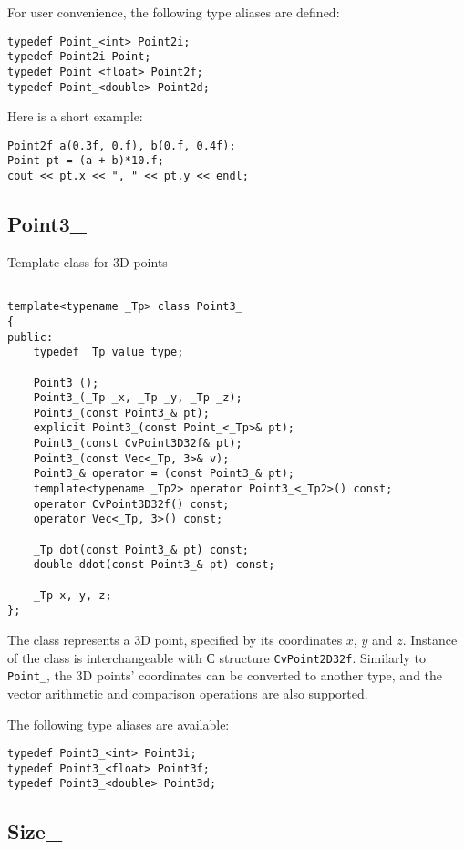 For user convenience, the following type aliases are defined:
\begin{lstlisting}
typedef Point_<int> Point2i;
typedef Point2i Point;
typedef Point_<float> Point2f;
typedef Point_<double> Point2d;
\end{lstlisting}

Here is a short example:
\begin{lstlisting}
Point2f a(0.3f, 0.f), b(0.f, 0.4f);
Point pt = (a + b)*10.f;
cout << pt.x << ", " << pt.y << endl; 
\end{lstlisting}

\subsection{Point3\_}

Template class for 3D points

\begin{lstlisting}

template<typename _Tp> class Point3_
{
public:
    typedef _Tp value_type;
    
    Point3_();
    Point3_(_Tp _x, _Tp _y, _Tp _z);
    Point3_(const Point3_& pt);
    explicit Point3_(const Point_<_Tp>& pt);
    Point3_(const CvPoint3D32f& pt);
    Point3_(const Vec<_Tp, 3>& v);
    Point3_& operator = (const Point3_& pt);
    template<typename _Tp2> operator Point3_<_Tp2>() const;
    operator CvPoint3D32f() const;
    operator Vec<_Tp, 3>() const;

    _Tp dot(const Point3_& pt) const;
    double ddot(const Point3_& pt) const;
    
    _Tp x, y, z;
};
\end{lstlisting}

The class represents a 3D point, specified by its coordinates $x$, $y$ and $z$.
Instance of the class is interchangeable with С structure \texttt{CvPoint2D32f}. Similarly to \texttt{Point\_}, the 3D points' coordinates can be converted to another type, and the vector arithmetic and comparison operations are also supported.

The following type aliases are available:

\begin{lstlisting}
typedef Point3_<int> Point3i;
typedef Point3_<float> Point3f;
typedef Point3_<double> Point3d;
\end{lstlisting}

\subsection{Size\_}

